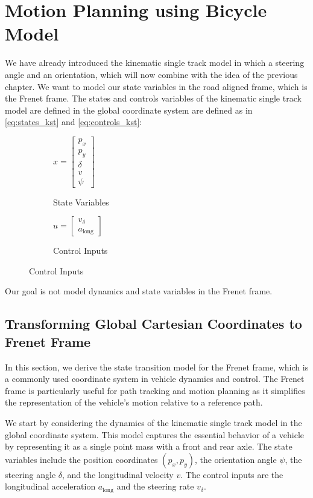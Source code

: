 \section{Motion Planning using Bicycle Model} \label{sec:motion_planning_using_bicylce}

We have already introduced the kinematic single track model in which a steering angle and an orientation, which will now combine with the idea of the
previous chapter.
We want to model our state variables in the road aligned frame, which is the Frenet frame.
The states and controls variables of the kinematic single track model are defined in the global coordinate system are defined as in \ref{eq:states_kst} and \ref{eq:controls_kst}:

\begin{figure}[h]
	\centering
	\begin{subfigure}[b]{0.45\textwidth}
		\centering
		$x = \begin{bmatrix} p_x \\ p_y \\ \delta \\ v \\ \psi \end{bmatrix}$
		\caption{State Variables}
	\end{subfigure}
	\hfill
	\begin{subfigure}[b]{0.45\textwidth}
		\centering
		$u = \begin{bmatrix} v_{\delta} \\ a_{\text{long}} \end{bmatrix}$
		\caption{Control Inputs}
	\end{subfigure}
\end{figure}

Our goal is not model dynamics and state variables in the Frenet frame.

\subsection{Transforming Global Cartesian Coordinates to Frenet Frame} \label{subsec:bicycle_conversion_of_cartesian_to_frenet}

In this section, we derive the state transition model for the Frenet frame, which is a commonly used coordinate system in vehicle dynamics and
control.
The Frenet frame is particularly useful for path tracking and motion planning as it simplifies the representation of the vehicle's motion relative to
a reference path.

We start by considering the dynamics of the kinematic single track model in the global coordinate system.
This model captures the essential behavior of a vehicle by representing it as a single point mass with a front and rear axle.
The state variables include the position coordinates $(p_x, p_y)$, the orientation angle $\psi$, the steering angle $\delta$, and the longitudinal
velocity $v$.
The control inputs are the longitudinal acceleration $a_{\text{long}}$ and the steering rate $v_{\delta}$.

